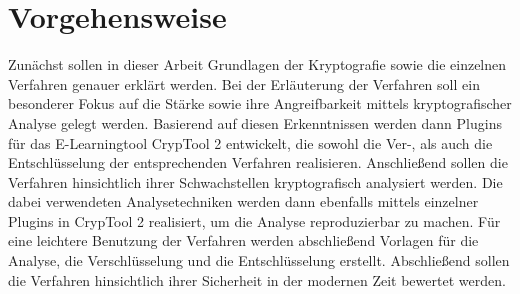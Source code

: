 \documentclass[fontsize=11pt, paper=a4, parskip=half]{scrartcl}
\begin{document}
\section{Vorgehensweise}
Zunächst sollen in dieser Arbeit Grundlagen der Kryptografie sowie die einzelnen Verfahren genauer erklärt werden. Bei der Erläuterung der Verfahren soll ein besonderer Fokus auf die Stärke sowie ihre Angreifbarkeit mittels kryptografischer Analyse gelegt werden. Basierend auf diesen Erkenntnissen werden dann Plugins für das E-Learningtool CrypTool 2 entwickelt, die sowohl die Ver-, als auch die Entschlüsselung der entsprechenden Verfahren realisieren. Anschließend sollen die Verfahren hinsichtlich ihrer Schwachstellen kryptografisch analysiert werden. Die dabei verwendeten Analysetechniken werden dann ebenfalls mittels einzelner Plugins in CrypTool 2 realisiert, um die Analyse reproduzierbar zu machen. Für eine leichtere Benutzung der Verfahren werden abschließend Vorlagen für die Analyse, die Verschlüsselung und die Entschlüsselung erstellt. Abschließend sollen die Verfahren hinsichtlich ihrer Sicherheit in der modernen Zeit bewertet werden.

\newpage
\end{document}
